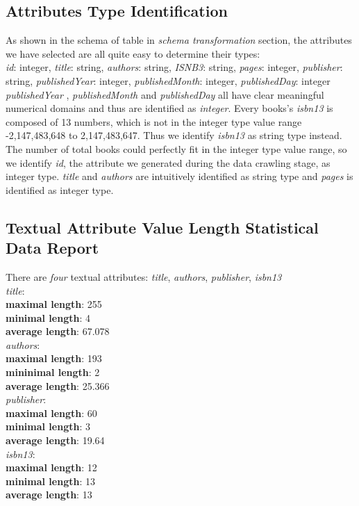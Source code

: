 \documentclass[10pt, oneside]{article}
\begin{document}
\subsection*{Attributes Type Identification}
As shown in the schema of table in \textit{schema transformation} section, the attributes we have selected are all quite easy to determine their types:
\vspace{1ex}
\\
\textit{id}: integer, \textit{title}: string, \textit{authors}: string, \textit{ISNB3}: string,  \textit{pages}: integer, \textit{publisher}: string, \textit{publishedYear}: integer, \textit{publishedMonth}: integer, \textit{publishedDay}: integer
\vspace{1ex}
\\
\textit{publishedYear} , \textit{publishedMonth} and \textit{publishedDay} all have clear meaningful numerical domains and thus are identified as \textit{integer}. Every books's \textit{isbn13} is composed of 13 numbers, which is not in the integer type value range  -2,147,483,648 to 2,147,483,647. Thus we identify \textit{isbn13} as string type instead.
The number of total books could perfectly fit in the integer type value range, so we identify \textit{id}, the attribute we generated during the data crawling stage, as integer type.
\textit{title} and \textit{authors} are intuitively identified as string type and \textit{pages} is identified as integer type.

\subsection*{Textual Attribute Value Length Statistical Data Report}
There are \textit{four} textual attributes: \textit{title}, \textit{authors}, \textit{publisher}, \textit{isbn13}
\vspace{0.5ex}
\\
\textit{title}: \\
\textbf{maximal length}: 255\\
\textbf{minimal length}: 4\\
\textbf{average length}: 67.078
\vspace{0.5ex}
\\
\textit{authors}:\\ 
\textbf{maximal length}: 193\\
\textbf{mininimal length}: 2\\
\textbf{average length}: 25.366
\vspace{0.5ex}
\\
\textit{publisher}:\\ 
\textbf{maximal length}: 60\\
\textbf{minimal length}: 3\\
\textbf{average length}: 19.64
\vspace{0.5ex}
\\
\textit{isbn13}:\\ 
\textbf{maximal length}: 12\\
\textbf{minimal length}: 13\\
\textbf{average length}: 13
\end{document}
